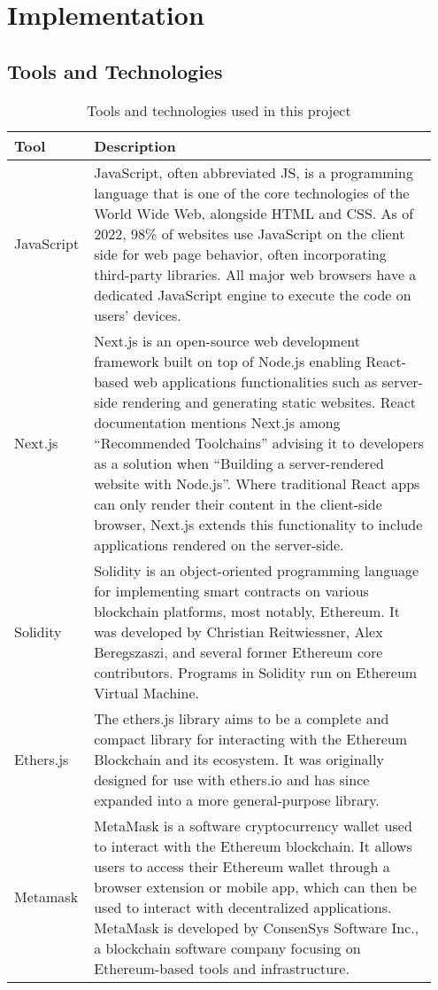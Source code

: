 \section{Implementation}

\subsection{Tools and Technologies}

\begin{longtable}{p{0.15\linewidth} | p{0.80\linewidth}}
  \caption{Tools and technologies used in this project}
  \label{tab:toolsAndTech}
  \\\toprule
  \centering
  Tool & Description
  \\\midrule
  JavaScript & {
    JavaScript, often abbreviated JS, is a programming language that is one of the core technologies of the World Wide Web, alongside HTML and CSS. As of 2022, 98\% of websites use JavaScript on the client side for web page behavior, often incorporating third-party libraries. All major web browsers have a dedicated JavaScript engine to execute the code on users' devices.
  }
  \\\hline
  Next.js & {
    Next.js is an open-source web development framework built on top of Node.js enabling React-based web applications functionalities such as server-side rendering and generating static websites. React documentation mentions Next.js among ``Recommended Toolchains'' advising it to developers as a solution when ``Building a server-rendered website with Node.js''. Where traditional React apps can only render their content in the client-side browser, Next.js extends this functionality to include applications rendered on the server-side.
  }
  \\\hline
  Solidity & {
    Solidity is an object-oriented programming language for implementing smart contracts on various blockchain platforms, most notably, Ethereum. It was developed by Christian Reitwiessner, Alex Beregszaszi, and several former Ethereum core contributors. Programs in Solidity run on Ethereum Virtual Machine.
  }
  \\\hline
  Ethers.js & {
    The ethers.js library aims to be a complete and compact library for interacting with the Ethereum Blockchain and its ecosystem. It was originally designed for use with ethers.io and has since expanded into a more general-purpose library.
  }
  \\\hline
  Metamask & {
    MetaMask is a software cryptocurrency wallet used to interact with the Ethereum blockchain. It allows users to access their Ethereum wallet through a browser extension or mobile app, which can then be used to interact with decentralized applications. MetaMask is developed by ConsenSys Software Inc., a blockchain software company focusing on Ethereum-based tools and infrastructure.
}
\end{longtable}
